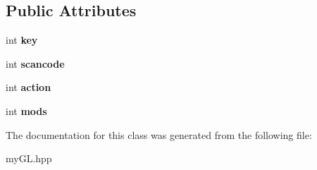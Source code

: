 \subsection*{Public Attributes}
\begin{DoxyCompactItemize}
\item 
int {\bfseries key}\hypertarget{classKey_a49ddb6c986197664f6939db5dfd9c244}{}\label{classKey_a49ddb6c986197664f6939db5dfd9c244}

\item 
int {\bfseries scancode}\hypertarget{classKey_a13cb660e3e0d92129eeeaa56c5cc8296}{}\label{classKey_a13cb660e3e0d92129eeeaa56c5cc8296}

\item 
int {\bfseries action}\hypertarget{classKey_add8acc14210865bd9959bf38ee4e82f8}{}\label{classKey_add8acc14210865bd9959bf38ee4e82f8}

\item 
int {\bfseries mods}\hypertarget{classKey_a0e3f757c5b28ee99c9bf6f07811e6637}{}\label{classKey_a0e3f757c5b28ee99c9bf6f07811e6637}

\end{DoxyCompactItemize}


The documentation for this class was generated from the following file\+:\begin{DoxyCompactItemize}
\item 
my\+G\+L.\+hpp\end{DoxyCompactItemize}
